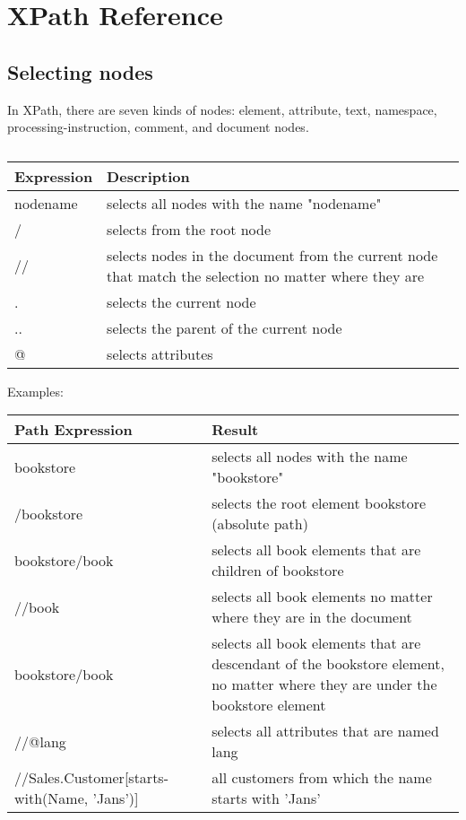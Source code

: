 \documentclass[11pt]{article}
\begin{document}
\section{XPath Reference}
\label{sec:orgf59df63}
\subsection{Selecting nodes}
\label{sec:orgfe875b6}
In XPath, there are seven kinds of nodes: element, attribute, text, namespace, processing-instruction, comment, and document nodes.
\begin{table}[htbp]
\caption{}
\centering
\begin{tabular}{ll}
Expression & Description\\
\hline
nodename & selects all nodes with the name "nodename"\\
/ & selects from the root node\\
// & selects nodes in the document from the current node that match the selection no matter where they are\\
. & selects the current node\\
.. & selects the parent of the current node\\
@ & selects attributes\\
\end{tabular}
\end{table}

Examples:
\begin{center}
\begin{tabular}{ll}
Path Expression & Result\\
\hline
bookstore & selects all nodes with the name "bookstore"\\
/bookstore & selects the root element bookstore (absolute path)\\
bookstore/book & selects all book elements that are children of bookstore\\
//book & selects all book elements no matter where they are in the document\\
bookstore/book & selects all book elements that are descendant of the bookstore element, no matter where they are under the bookstore element\\
//@lang & selects all attributes that are named lang\\
//Sales.Customer[starts-with(Name, 'Jans')] & all customers from which the name starts with 'Jans'\\
\end{tabular}
\end{center}
\end{document}
